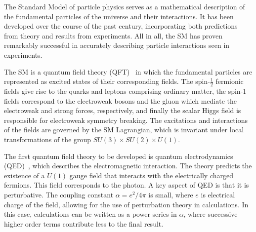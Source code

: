 ﻿%

The Standard Model of particle physics serves as a mathematical description of the fundamental particles of the universe and their interactions.
It has been developed over the course of the past century, incorporating both predictions from theory and results from experiments.
All in all, the SM has proven remarkably successful in accurately describing particle interactions seen in experiments.

The SM is a quantum field theory (QFT)~\cite{1995.Weinberg, 1995.Peskin} in which the fundamental particles are represented as excited states of their corresponding fields.
The spin-$\frac{1}{2}$ fermionic fields give rise to the quarks and leptons comprising ordinary matter, the spin-1 fields correspond to the electroweak bosons and the gluon which mediate the electroweak and strong forces, respectively, and finally the scalar Higgs field is responsible for electroweak symmetry breaking.
The excitations and interactions of the fields are governed by the SM Lagrangian, which is invariant under local transformations of the group $SU(3)\times SU(2)\times U(1)$.

The first quantum field theory to be developed is quantum electrodynamics (QED)~\cite{1950.Feynman.QED}, which describes the electromagnetic interaction.
The theory predicts the existence of a $U(1)$ gauge field that interacts with the electrically charged fermions.
This field corresponds to the photon.
A key aspect of QED is that it is perturbative.
The coupling constant $\alpha = e^2/4\pi$ is small, where $e$ is electrical charge of the field, allowing for the use of perturbation theory in calculations.
In this case, calculations can be written as a power series in $\alpha$, where successive higher order terms contribute less to the final result.


